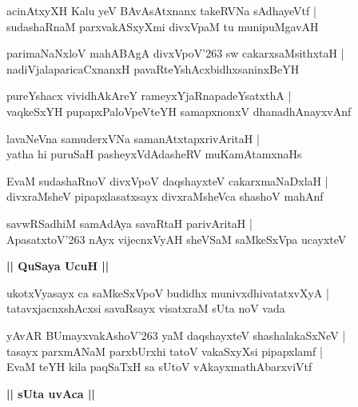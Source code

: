 \documentclass[twoside,12pt,openright]{book}
\newcounter{shloka}[chapter]
\def\uvaca#1{\centerline{{\large\textbf{#1}}}}
\begin{document}
\begin{shloka}
acinAtxyXH Kalu yeV BAvAsAtxnanx takeRVNa sAdhayeVtf |\\
sudashaRnaM  parxvakASxyXmi divxVpaM tu munipuMgavAH
\end{shloka}

\begin{shloka}
parimaNaNxloV mahABAgA divxVpoV\char'263 sw cakarxsaMsithxtaH |\\
nadiVjalaparicaCxnanxH pavaRteYshAcxbidhxsaninxBeYH
\end{shloka}

\begin{shloka}
pureYshacx vividhAkAreY rameyxYjaRnapadeYsatxthA |\\
vaqkeSxYH pupapxPaloVpeVteYH samapxnonxV dhanadhAnayxvAnf
\end{shloka}

\begin{shloka}
lavaNeVna samuderxVNa samanAtxtapxrivAritaH |\\
yatha hi puruSaH pasheyxVdAdasheRV muKamAtamxnaHs
\end{shloka}

\begin{shloka}
EvaM sudashaRnoV divxVpoV daqshayxteV cakarxmaNaDxlaH |\\
divxraMsheV pipapxlasatxsayx divxraMsheVca shashoV mahAnf
\end{shloka}

\begin{shloka}
savwRSadhiM samAdAya savaRtaH parivAritaH |\\
ApasatxtoV\char'263 nAyx vijecnxVyAH sheVSaM saMkeSxVpa ucayxteV
\end{shloka}

\uvaca{|| QuSaya UcuH ||}

\begin{shloka}
ukotxVyasayx ca saMkeSxVpoV budidhx munivxdhivatatxvXyA |\\
tatavxjacnxshAcxsi savaRsayx visatxraM sUta noV vada
\end{shloka}

\begin{shloka}
yAvAR BUmayxvakAshoV\char'263 yaM daqshayxteV shashalakaSxNeV |\\
tasayx parxmANaM parxbUrxhi tatoV vakaSxyXsi pipapxlamf |\\
EvaM teYH kila paqSaTxH sa sUtoV vAkayxmathAbarxviVtf
\end{shloka}

\uvaca{|| sUta uvAca ||}
\end{document}
